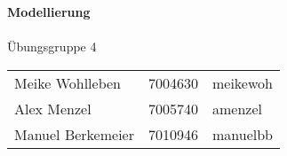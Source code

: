 \begin{titlepage}
\begin{center}
    \vspace*{2cm}
    \Huge\textsf\textbf{Modellierung}\\[2cm]
    \Large\textsf\thetitle\\[1cm]
    \large\textsf{Übungsgruppe 4}\\[4cm]
    \begin{tabular}{lll}
        Meike Wohlleben & 7004630 & meikewoh \\
         Alex Menzel & 7005740 & amenzel   \\
         Manuel Berkemeier & 7010946 & manuelbb 
    \end{tabular}
\end{center}
\end{titlepage}